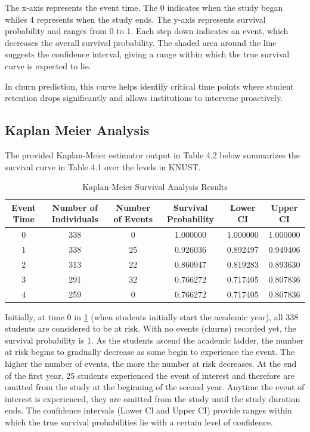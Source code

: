 \documentclass[doublespacing]{report} [12px]%
\begin{document}
The x-axis represents the event time. The 0 indicates when the study began whiles 4 represents when the study ends. The y-axis represents survival probability and ranges from 0 to 1. Each step down indicates an event, which decreases the overall survival probability.  The shaded area around the line suggests the confidence interval, giving a range within which the true survival curve is expected to lie.

In churn prediction, this curve helps identify critical time points where student retention drops significantly and allows institutions to intervene proactively. 



\subsection{Kaplan Meier Analysis}

The provided Kaplan-Meier estimator output in Table 4.2 below summarizes the survival curve in Table 4.1 over the levels in KNUST.


\begin{table}[H]
\centering
\begin{tabular}{cccccc}
\toprule
Event Time & Number of Individuals & Number of Events & Survival Probability & Lower CI & Upper CI \\
\midrule
0 & 338 & 0 & 1.000000 & 1.000000 & 1.000000 \\
1 & 338 & 25 & 0.926036 & 0.892497 & 0.949406 \\
2 & 313 & 22 & 0.860947 & 0.819283 & 0.893630 \\
3 & 291 & 32 & 0.766272 & 0.717405 & 0.807836 \\
4 & 259 & 0 & 0.766272 & 0.717405 & 0.807836 \\
\bottomrule
\end{tabular}
    \caption{Kaplan-Meier Survival Analysis Results}
    \label{tab:km_results}
\end{table}


Initially, at time 0 in \ref{tab:km_results} (when students initially start the academic year), all 338 students are considered to be at risk. With no events (churns) recorded yet, the survival probability is 1.
As the students ascend the academic ladder, the number at risk begins to gradually decrease as some begin to experience the event. The higher the number of events, the more the number at risk decreases. 
At the end of the first year, 25 students experienced the event of interest and therefore are omitted from the study at the beginning of the second year.  Anytime the event of interest is experienced, they are omitted from the study until the study duration ends.   
The confidence intervals (Lower Cl and Upper CI) provide ranges within which the true survival probabilities lie with a certain level of confidence.
\end{document}
